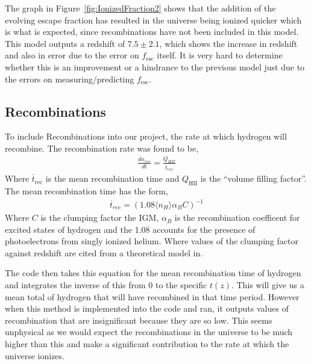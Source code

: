 		The graph in Figure~\ref{fig:IonizedFraction2} shows that the addition of the evolving escape fraction has resulted in the universe being ionized quicker which is what is expected, since recombinations have not been included in this model. This model outputs a redshift of $7.5\pm2.1$, which shows the increase in redshift and also in error due to the error on $f_\text{esc}$ itself. It is very hard to determine whether this is an improvement or a hindrance to the previous model just due to the errors on measuring/predicting $f_\text{esc}$.

	\subsection{Recombinations} %
	\label{sub:recombinations}
		To include Recombinations into our project, the rate at which hydrogen will recombine. The recombination rate was found to be,
		\begin{align}
			\frac{dn_{rec}}{dt}=\frac{Q_{HII}}{\overline{t}_{rec}}
		\end{align}
		Where $\overline{t}_\text{rec}$ is the mean recombination time and $Q_\text{HII}$ is the ``volume filling factor''\cite{2012ApJ...746..125H}. The mean recombination time has the form,
		\begin{align}
			\overline{t}_{rec}= {\left(1.08\langle n_{H}\rangle\alpha_{B}C\right)}^{-1}
		\end{align}
		Where $C$ is the clumping factor the IGM, $\alpha_{B}$ is the recombination coefficent for excited states of hydrogen and the 1.08 accounts for the presence of photoelectrons from singly ionized helium. Where values of the clumping factor against redshift are cited from a theoretical model in\cite{2011MNRAS.412L..16R}.

		The code then takes this equation for the mean recombination time of hydrogen and integrates the inverse of this from 0 to the specific $t(z)$. This will give us a mean total of hydrogen that will have recombined in that time period. However when this method is implemented into the code and ran, it outputs values of recombination that are insignificant because they are so low. This seems unphysical as we would expect the recombinations in the universe to be much higher than this and make a significant contribution to the rate at which the universe ionizes.

